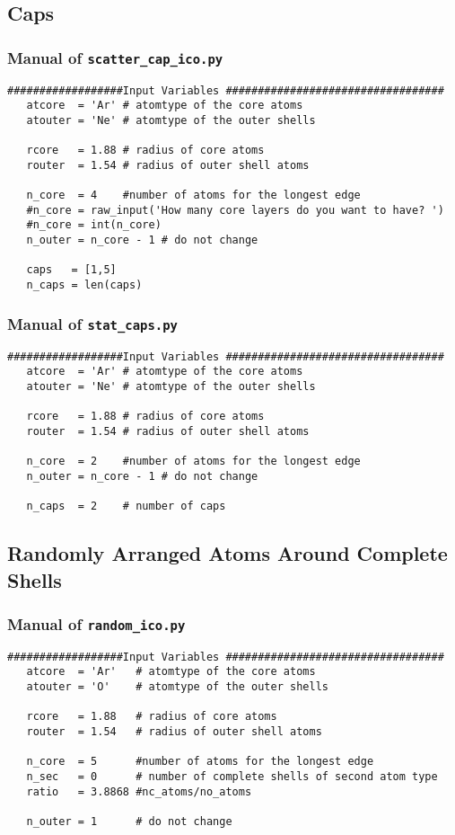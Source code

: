 \subsection{Caps}
\subsubsection{Manual of \lstinline|scatter_cap_ico.py|}

\begin{lstlisting}
##################Input Variables ##################################
   atcore  = 'Ar' # atomtype of the core atoms
   atouter = 'Ne' # atomtype of the outer shells
   
   rcore   = 1.88 # radius of core atoms
   router  = 1.54 # radius of outer shell atoms
   
   n_core  = 4    #number of atoms for the longest edge
   #n_core = raw_input('How many core layers do you want to have? ')
   #n_core = int(n_core)
   n_outer = n_core - 1 # do not change
   
   caps   = [1,5]
   n_caps = len(caps)
\end{lstlisting}

\subsubsection{Manual of \lstinline|stat_caps.py|}
\begin{lstlisting}
##################Input Variables ##################################
   atcore  = 'Ar' # atomtype of the core atoms
   atouter = 'Ne' # atomtype of the outer shells
   
   rcore   = 1.88 # radius of core atoms
   router  = 1.54 # radius of outer shell atoms
   
   n_core  = 2    #number of atoms for the longest edge
   n_outer = n_core - 1 # do not change
   
   n_caps  = 2    # number of caps
\end{lstlisting}



\subsection{Randomly Arranged Atoms Around Complete Shells}
\subsubsection{Manual of \lstinline|random_ico.py|}
\begin{lstlisting}
##################Input Variables ##################################
   atcore  = 'Ar'   # atomtype of the core atoms
   atouter = 'O'    # atomtype of the outer shells
   
   rcore   = 1.88   # radius of core atoms
   router  = 1.54   # radius of outer shell atoms
   
   n_core  = 5      #number of atoms for the longest edge
   n_sec   = 0      # number of complete shells of second atom type
   ratio   = 3.8868 #nc_atoms/no_atoms
   
   n_outer = 1      # do not change
\end{lstlisting}

